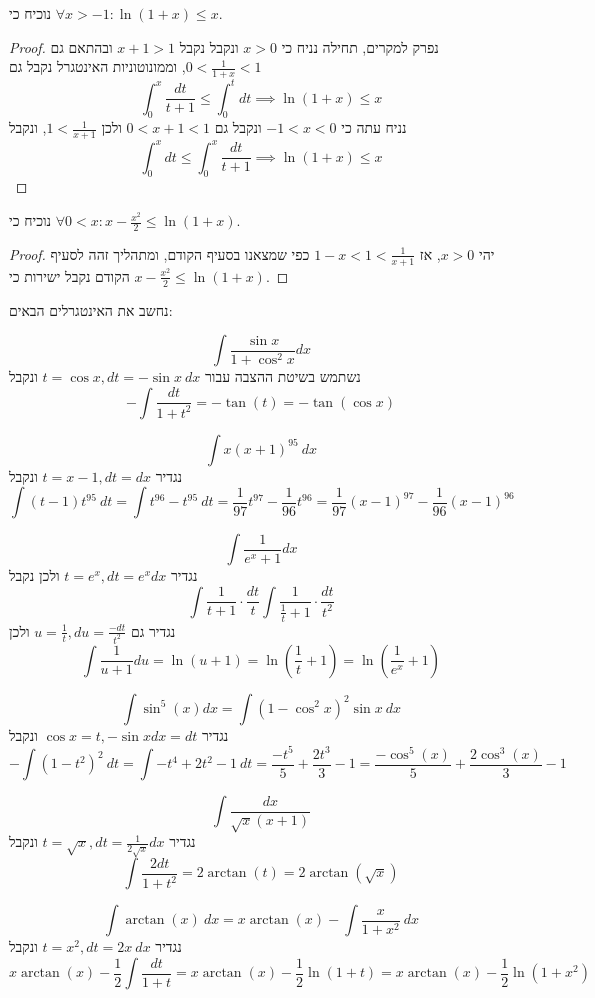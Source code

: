 \Subquestion{} 
נוכיח כי $\forall x > -1 : \ln(1 + x) \le x$.
\begin{proof}
	נפרק למקרים, תחילה נניח כי $x > 0$ ונקבל נקבל $x + 1 > 1$ ובהתאם גם $0 < \frac{1}{1 + x} < 1$, וממונוטוניות האינטגרל נקבל גם
	\[
		\int_{0}^{x} \frac{dt}{t + 1} \le \int_{0}^{t} dt
		\implies \ln(1 + x) \le x
	\]
	נניח עתה כי $-1 < x < 0$ ונקבל גם $0 < x + 1 < 1$ ולכן $1 < \frac{1}{x + 1}$, ונקבל
	\[
		\int_{0}^{x} dt \le \int_{0}^{x} \frac{dt}{t + 1}
		\implies \ln(1 + x) \le x
	\]
\end{proof}

\Subquestion{}
נוכיח כי $\forall 0 < x : x - \frac{x^2}{2} \le \ln(1 + x)$.
\begin{proof}
	יהי $x > 0$, אז $1 - x < 1 < \frac{1}{x + 1}$ כפי שמצאנו בסעיף הקודם, ומתהליך זהה לסעיף הקודם נקבל ישירות כי $x - \frac{x^2}{2} \le \ln(1 + x)$.
\end{proof}

\Question{}
נחשב את האינטגרלים הבאים:

\Subquestion{}
\[
	\int \frac{\sin x}{1 + \cos^2 x} dx
\]
נשתמש בשיטת ההצבה עבור $t = \cos x, dt = -\sin x\ dx$ ונקבל
\[
	-\int \frac{dt}{1 + t^2} = -\tan(t)
	= -\tan(\cos x)
\]

\Subquestion{}
\[
	\int x {(x + 1)}^{95}\ dx
\]
נגדיר $t = x - 1, dt = dx$ ונקבל
\[
	\int (t - 1) t^{95}\ dt = \int t^{96} - t^{95}\ dt
	= \frac{1}{97} t^{97} - \frac{1}{96} t^{96}
	= \frac{1}{97} {(x - 1)}^{97} - \frac{1}{96} {(x - 1)}^{96}
\]

\Subquestion{}
\[
	\int \frac{1}{e^x + 1} dx
\]
נגדיר $t = e^x, dt = e^x dx$ ולכן נקבל
\[
	\int \frac{1}{t + 1} \cdot \frac{dt}{t}
	\int \frac{1}{\frac{1}{t} + 1} \cdot \frac{dt}{t^2}
\]
נגדיר גם $u = \frac{1}{t}, du = \frac{-dt}{t^2}$ ולכן
\[
	\int \frac{1}{u + 1} du = \ln(u + 1)
	= \ln(\frac{1}{t} + 1)
	= \ln(\frac{1}{e^x} + 1)
\]

\Subquestion{}
\[
	\int \sin^5(x) dx
	= \int {(1 - \cos^2 x)}^2 \sin x\ dx
\]
נגדיר $\cos x = t, -\sin x dx = dt$ ונקבל
\[
	-\int {(1 - t^2)}^2\ dt
	= \int -t^4 + 2t^2 - 1\ dt
	= \frac{-t^5}{5} + \frac{2t^3}{3} - 1
	= \frac{-\cos^5(x)}{5} + \frac{2\cos^3(x)}{3} - 1
\]

\Subquestion{}
\[
	\int \frac{dx}{\sqrt{x} (x + 1)}
\]
נגדיר $t = \sqrt{x}, dt = \frac{1}{2 \sqrt{x}}dx$ ונקבל
\[
	\int \frac{2dt}{1 + t^2}
	= 2 \arctan(t)
	= 2 \arctan(\sqrt{x})
\]

\Subquestion{}
\[
	\int \arctan(x)\ dx
	= x \arctan(x) - \int \frac{x}{1 + x^2}\ dx
\]
נגדיר $t = x^2, dt = 2x\ dx$ ונקבל
\[
	x \arctan(x) - \frac{1}{2} \int \frac{dt}{1 + t}
	= x \arctan(x) - \frac{1}{2}\ln(1 + t)
	= x \arctan(x) - \frac{1}{2}\ln(1 + x^2)
\]


